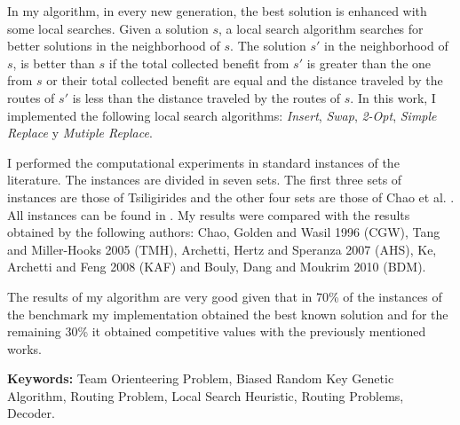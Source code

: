 \bigskip

In my algorithm, in every new generation, the best solution is enhanced with some local searches. Given a solution $s$, a local search algorithm searches for better solutions in the neighborhood of $s$. The solution $s'$ in the neighborhood of $s$, is better than $s$ if the total collected benefit from $s'$ is greater than the one from $s$ or their total collected benefit are equal and the distance traveled by the routes of $s'$ is less than the distance traveled by the routes of $s$. In this work, I implemented the following local search algorithms: \textit{Insert}, \textit{Swap}, \textit{2-Opt}, \textit{Simple Replace} y \textit{Mutiple Replace}.

\bigskip

I performed the computational experiments in standard instances of the literature. The instances are divided in seven sets. The first three sets of instances are those of Tsiligirides \cite{Tsiligirides} and the other four sets are those of Chao et al. \cite{ChaoGoldenWasil}. All instances can be found in \cite{IntancesChaoTsiligirides}. My results were compared with the results obtained by the following authors: Chao, Golden and Wasil 1996 \cite{ChaoGoldenWasil} (CGW), Tang and Miller-Hooks 2005 \cite{TangMillerHooks} (TMH), Archetti, Hertz and Speranza 2007 \cite{ArchettiHertzSperanza} (AHS), Ke, Archetti and Feng 2008 \cite{KeArchettiFeng} (KAF) and Bouly, Dang and Moukrim 2010 \cite{BoulyDangMoukrim} (BDM). 

\bigskip

The results of my algorithm are very good given that in 70\% of the instances of the benchmark my implementation obtained the best known solution and for the remaining 30\% it obtained competitive values with the previously mentioned works.

\bigskip

\noindent\textbf{Keywords:} Team Orienteering Problem, Biased Random Key Genetic Algorithm, Routing Problem, Local Search Heuristic, Routing Problems, Decoder.